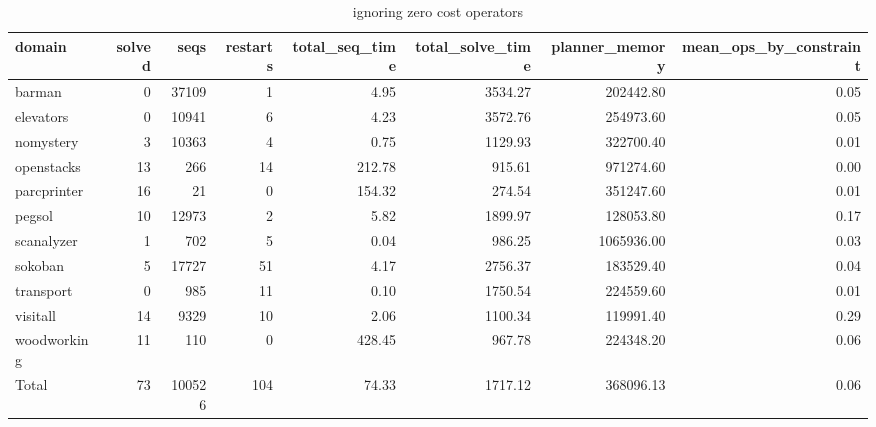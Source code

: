 \begin{table*}[htbp]
\centering
\begingroup\small
\begin{tabular}{lrrrrrrr}
  \hline
domain & solved & seqs & restarts & total\_seq\_time & total\_solve\_time & planner\_memory & mean\_ops\_by\_constraint \\ 
  \hline
barman &   0 & 37109 &   1 & 4.95 & 3534.27 & 202442.80 & 0.05 \\ 
  elevators &   0 & 10941 &   6 & 4.23 & 3572.76 & 254973.60 & 0.05 \\ 
  nomystery &   3 & 10363 &   4 & 0.75 & 1129.93 & 322700.40 & 0.01 \\ 
  openstacks &  13 & 266 &  14 & 212.78 & 915.61 & 971274.60 & 0.00 \\ 
  parcprinter &  16 &  21 &   0 & 154.32 & 274.54 & 351247.60 & 0.01 \\ 
  pegsol &  10 & 12973 &   2 & 5.82 & 1899.97 & 128053.80 & 0.17 \\ 
  scanalyzer &   1 & 702 &   5 & 0.04 & 986.25 & 1065936.00 & 0.03 \\ 
  sokoban &   5 & 17727 &  51 & 4.17 & 2756.37 & 183529.40 & 0.04 \\ 
  transport &   0 & 985 &  11 & 0.10 & 1750.54 & 224559.60 & 0.01 \\ 
  visitall &  14 & 9329 &  10 & 2.06 & 1100.34 & 119991.40 & 0.29 \\ 
  woodworking &  11 & 110 &   0 & 428.45 & 967.78 & 224348.20 & 0.06 \\ 
  Total &  73 & 100526 & 104 & 74.33 & 1717.12 & 368096.13 & 0.06 \\ 
   \hline
\end{tabular}
\endgroup
\caption{\oursolver{} ignoring zero cost operators} 
\label{tab:our_ignoring}
\end{table*}
